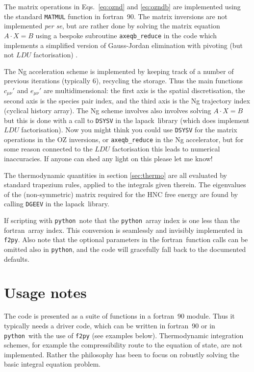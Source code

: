 \documentclass[12pt,a4paper]{article}
\newcommand{\latin}[1]{\emph{#1}}
\newcommand{\perse}{\latin{per se}}
\newcommand{\Eqsref}[1]{Eqs.~\eqref{#1}}
\newcommand{\FORTRAN}{{\sc fortran}}
\newcommand{\python}{{\tt python}}
\newcommand{\LAPACK}{{\sc lapack}}
\begin{document}
The matrix operations in \Eqsref{eq:oznd} and \eqref{eq:ozndb} are
implemented using the standard \verb+MATMUL+ function in \FORTRAN\ 90.
The matrix inversions are not implemented \perse, but are rather done
by solving the matrix equation $A\cdot X=B$ using a bespoke subroutine
\verb+axeqb_reduce+ in the code which implements a simplified version
of Gauss-Jordan elimination with pivoting (but not $LDU$
factorisation) \cite{NR92}.

The Ng acceleration scheme is implemented by keeping track of a number
of previous iterations (typically 6), recycling the storage.  Thus the
main functions $c_{\mu\nu}'$ and $e_{\mu\nu}'$ are multidimensional:
the first axis is the spatial discretisation, the second axis is the
species pair index, and the third axis is the Ng trajectory index
(cyclical history array).  The Ng scheme involves also involves
solving $A\cdot X=B$ but this is done with a call to \verb+DSYSV+ in
the \LAPACK\ library (which does implement $LDU$ factorisation).  Now
you might think you could use \verb+DSYSV+ for the matrix operations
in the OZ inversions, or \verb+axeqb_reduce+ in the Ng accelerator,
but for some reason connected to the $LDU$ factorisation this leads to
numerical inaccuracies.  If anyone can shed any light on this please
let me know!

The thermodynamic quantities in section \ref{sec:thermo} are all
evaluated by standard trapezium rules, applied to the integrals given
therein.  The eigenvalues of the (non-symmetric) matrix required for the HNC
free energy are found by calling \verb+DGEEV+  in the \LAPACK\ library.

If scripting with \python\ note that the \python\ array index is one
less than the \FORTRAN\ array index.  This conversion is seamlessly
and invisibly implemented in \verb+f2py+.  Also note that the optional
parameters in the \FORTRAN\ function calls can be omitted also in \python,
and the code will gracefully fall back to the documented defaults.

\section{Usage notes}
%
The code is presented as a suite of functions in a \FORTRAN\ 90
module.  Thus it typically needs a driver code, which can be written
in \FORTRAN\ 90 or in \python\ with the use of \verb+f2py+ (see
examples below).  Thermodynamic integration schemes, for example the
compressibility route to the equation of state, are not implemented.
Rather the philosophy has been to focus on robustly solving the basic
integral equation problem.
\end{document}
